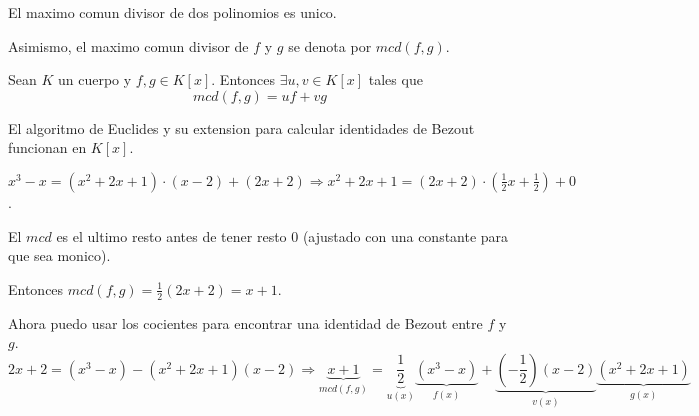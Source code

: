 \begin{proposition}[Unicidad]
	El maximo comun divisor de dos polinomios es unico.
\end{proposition}
Asimismo, el maximo comun divisor de \(f \) y \(g \) se denota por \(mcd(f,g )\).
\begin{proposition}
	Sean \(K \) un cuerpo y \(f,g \in K[x ]\). Entonces \(\exists u,v \in K[x ]\) tales que
	\[
		mcd(f,g) = uf + vg
	\]
\end{proposition}
\begin{remark}
	El algoritmo de Euclides y su extension para calcular identidades de Bezout funcionan en \(K[x ]\).
	
	\(x^{3} - x = (x^{2} + 2x + 1 ) \cdot (x-2) + (2x + 2) \Rightarrow x^{2} + 2x + 1 = (2x +2) \cdot (\frac{1}{2}x + \frac{1}{2}) + 0   \).
	
	El \(mcd \) es el ultimo resto antes de tener resto \(0 \) (ajustado con una constante para que sea monico).
	
	Entonces \(mcd(f,g) = \frac{1}{2}(2x + 2) = x + 1\).
	
	Ahora puedo usar los cocientes para encontrar una identidad de Bezout entre \(f \) y \(g \).
	\[
		2x + 2 = (x^{3} - x ) - (x^{2} + 2x + 1)(x-2) \Rightarrow \underbrace{x + 1}_{mcd(f,g)} = \underbrace{\frac{1}{2}}_{u(x)}\underbrace{(x^{3} - x )}_{f(x)} + \underbrace{(-\frac{1}{2})(x-2)}_{v(x)}\underbrace{(x^{2} + 2x + 1 )}_{g(x)}
	\]
\end{remark}

